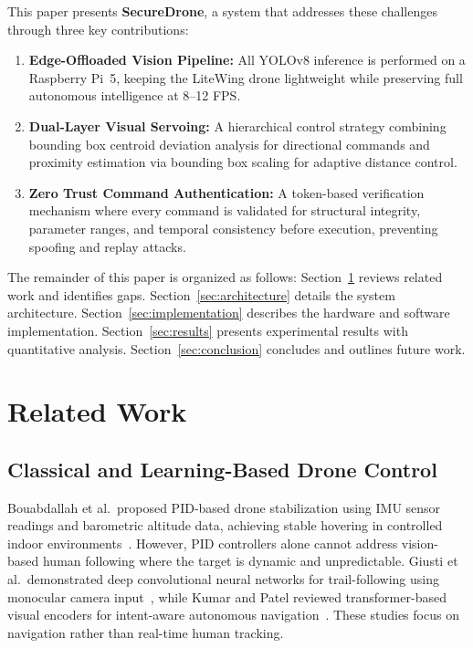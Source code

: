 \documentclass[conference]{IEEEtran}
\begin{document}
This paper presents \textbf{SecureDrone}, a system that addresses these challenges through three key contributions:
\begin{enumerate}
    \item \textbf{Edge-Offloaded Vision Pipeline:} All YOLOv8 inference is performed on a Raspberry Pi~5, keeping the LiteWing drone lightweight while preserving full autonomous intelligence at 8--12 FPS.
    \item \textbf{Dual-Layer Visual Servoing:} A hierarchical control strategy combining bounding box centroid deviation analysis for directional commands and proximity estimation via bounding box scaling for adaptive distance control.
    \item \textbf{Zero Trust Command Authentication:} A token-based verification mechanism where every command is validated for structural integrity, parameter ranges, and temporal consistency before execution, preventing spoofing and replay attacks.
\end{enumerate}

The remainder of this paper is organized as follows: Section~\ref{sec:related} reviews related work and identifies gaps. Section~\ref{sec:architecture} details the system architecture. Section~\ref{sec:implementation} describes the hardware and software implementation. Section~\ref{sec:results} presents experimental results with quantitative analysis. Section~\ref{sec:conclusion} concludes and outlines future work.

\section{Related Work}
\label{sec:related}

\subsection{Classical and Learning-Based Drone Control}

Bouabdallah et al.\ proposed PID-based drone stabilization using IMU sensor readings and barometric altitude data, achieving stable hovering in controlled indoor environments~\cite{bresciani2008}. However, PID controllers alone cannot address vision-based human following where the target is dynamic and unpredictable. Giusti et al.\ demonstrated deep convolutional neural networks for trail-following using monocular camera input~\cite{goodfellow2016}, while Kumar and Patel reviewed transformer-based visual encoders for intent-aware autonomous navigation~\cite{szeliski2010}. These studies focus on navigation rather than real-time human tracking.
\end{document}
